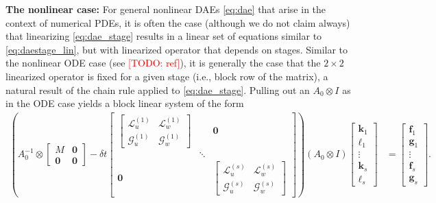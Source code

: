 \documentclass[review]{siamart}
\makeatletter
\newcommand{\todo}[1]{\textcolor{red}{[TODO\@: #1]}}
\makeatother
\begin{document}
\textbf{The nonlinear case:} For general nonlinear DAEs \eqref{eq:dae} that arise
in the context of numerical PDEs, it is often the case (although we do not
claim always) that linearizing \eqref{eq:dae_stage} results in a linear set of
equations similar to \eqref{eq:daestage_lin}, but with linearized operator that
depends on stages. Similar to the nonlinear ODE case (see \todo{ref}), it is
generally the case that the $2\times 2$ linearized operator is fixed for a
given stage (i.e., block row of the matrix), a natural result of the chain
rule applied to \eqref{eq:dae_stage}. Pulling out an $A_0\otimes I$ as
in the ODE case yields a block linear system of the form
%
{\small
\begin{align}\label{eq:daestage_nonlin}
\left( A_0^{-1}\otimes \begin{bmatrix}M & \mathbf{0} \\ \mathbf{0} & \mathbf{0}\end{bmatrix}
	- \delta t\begin{bmatrix}
		\begin{bmatrix} \mathcal{L}_{u}^{(1)} & \mathcal{L}_{w}^{(1)} \\
			\mathcal{G}_{u}^{(1)} & \mathcal{G}_w^{(1)} \end{bmatrix} & & \mathbf{0} \\
		& \ddots & \\
		\mathbf{0} &&\begin{bmatrix} \mathcal{L}_{u}^{(s)} & \mathcal{L}_{w}^{(s)} \\
			\mathcal{G}_{u}^{(s)} & \mathcal{G}_w^{(s)} \end{bmatrix}
	\end{bmatrix} \right)
	(A_0 \otimes I)
	\begin{bmatrix} \mathbf{k}_1 \\ \boldsymbol{\ell}_1 \\ \vdots \\
		\mathbf{k}_s \\ \boldsymbol{\ell}_s\end{bmatrix} 
& = \begin{bmatrix} \mathbf{f}_1 \\ \mathbf{g}_1 \\ \vdots \\
	\mathbf{f}_s \\ \mathbf{g}_s \end{bmatrix}.
\end{align}
}
%
\end{document}
